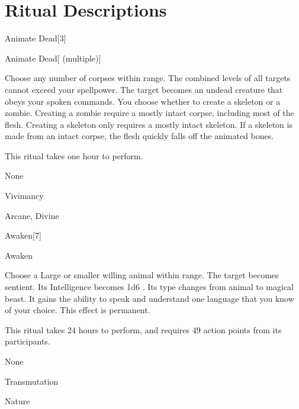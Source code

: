 
\section{Ritual Descriptions}

\begin{spellsection}{Animate Dead}[3]

\begin{spellheader}
\end{spellheader}


\begin{ability}{Animate Dead}[ (multiple)]

Choose any number of corpses within \rngclose range.
The combined levels of all targets cannot exceed your spellpower.
The target becomes an undead creature that obeys your spoken commands.
You choose whether to create a skeleton or a zombie.
Creating a zombie require a mostly intact corpse, including most of the flesh.
Creating a skeleton only requires a mostly intact skeleton.
If a skeleton is made from an intact corpse, the flesh quickly falls off the animated bones.

This ritual takes one hour to perform.

\end{ability}


 None

 Vivimancy

 Arcane, Divine
\end{spellsection}


\begin{spellsection}{Awaken}[7]


\begin{ability}{Awaken}

Choose a Large or smaller willing animal within \rngclose range.
The target becomes sentient.
Its Intelligence becomes 1d6 .
Its type changes from animal to magical beast.
It gains the ability to speak and understand one language that you know of your choice.
This effect is permanent.

This ritual takes 24 hours to perform, and requires 49 action points from its participants.

\end{ability}


 None

 Transmutation

 Nature
\end{spellsection}


